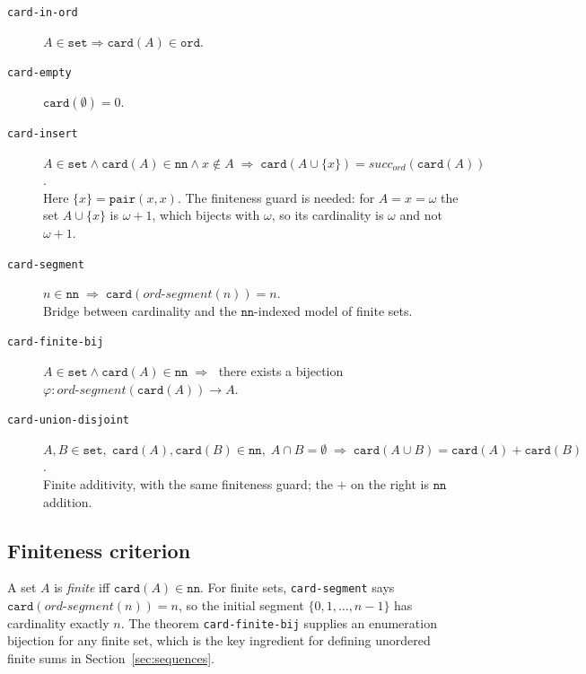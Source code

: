 \begin{description}
\item[\texttt{card-in-ord}]
  $A \in \mathtt{set} \Rightarrow \mathtt{card}(A) \in \mathtt{ord}$.

\item[\texttt{card-empty}]
  $\mathtt{card}(\emptyset) = 0$.

\item[\texttt{card-insert}]
  $A \in \mathtt{set} \wedge \mathtt{card}(A) \in \mathtt{nn} \wedge x \notin A \;\Rightarrow\;
   \mathtt{card}(A \cup \{x\}) = \mathit{succ_{ord}}(\mathtt{card}(A))$.\\
  Here $\{x\} = \mathtt{pair}(x,x)$.  The finiteness guard is needed:
  for $A = x = \omega$ the set $A \cup \{x\}$ is $\omega + 1$, which
  bijects with $\omega$, so its cardinality is $\omega$ and not $\omega + 1$.

\item[\texttt{card-segment}]
  $n \in \mathtt{nn} \;\Rightarrow\; \mathtt{card}(\mathit{ord\text{-}segment}(n)) = n$.\\
  Bridge between cardinality and the $\mathtt{nn}$-indexed model of finite sets.

\item[\texttt{card-finite-bij}]
  $A \in \mathtt{set} \wedge \mathtt{card}(A) \in \mathtt{nn} \;\Rightarrow\;$
  there exists a bijection
  $\varphi : \mathit{ord\text{-}segment}(\mathtt{card}(A)) \to A$.

\item[\texttt{card-union-disjoint}]
  $A, B \in \mathtt{set},\;
   \mathtt{card}(A), \mathtt{card}(B) \in \mathtt{nn},\;
   A \cap B = \emptyset \;\Rightarrow\;
   \mathtt{card}(A \cup B) = \mathtt{card}(A) + \mathtt{card}(B)$.\\
  Finite additivity, with the same finiteness guard; the $+$ on the right is
  $\mathtt{nn}$ addition.
\end{description}

\subsection*{Finiteness criterion}

A set $A$ is \emph{finite} iff $\mathtt{card}(A) \in \mathtt{nn}$.
For finite sets, \texttt{card-segment} says
$\mathtt{card}(\mathit{ord\text{-}segment}(n)) = n$, so the initial
segment $\{0, 1, \ldots, n-1\}$ has cardinality exactly $n$.  The
theorem \texttt{card-finite-bij} supplies an enumeration bijection for
any finite set, which is the key ingredient for defining unordered
finite sums in Section~\ref{sec:sequences}.


